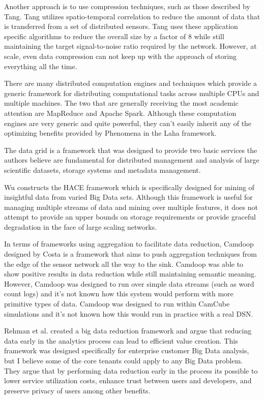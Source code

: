 Another approach is to use compression techniques, such as those described by Tang\cite{tang2004compression}. Tang utilizes spatio-temporal correlation to reduce the amount of data that is transferred from a set of distributed sensors. Tang uses these application specific algorithms to reduce the overall size by a factor of 8 while still maintaining the target signal-to-noise ratio required by the network. However, at scale, even data compression can not keep up with the approach of storing everything all the time.

There are many distributed computation engines and techniques which provide a generic framework for distributing computational tasks across multiple CPUs and multiple machines. The two that are generally receiving the most academic attention are MapReduce\cite{dean2008mapreduce} and Apache Spark\cite{zaharia2016apache}. Although these computation engines are very generic and quite powerful, they can't easily inherit any of the optimizing benefits provided by Phenomena in the Laha framework.

The data grid\cite{chervenak2000data} is a framework that was designed to provide two basic services the authors believe are fundamental for distributed management and analysis of large scientific datasets, storage systems and metadata management.

Wu\cite{wu2014data} constructs the HACE framework which is specifically designed for mining of insightful data from varied Big Data sets. Although this framework is useful for managing multiple streams of data and mining over multiple features, it does not attempt to provide an upper bounds on storage requirements or provide graceful degradation in the face of large scaling networks.

In terms of frameworks using aggregation to facilitate data reduction, Camdoop designed by Costa\cite{costa2012camdoop} is a framework that aims to push aggregation techniques from the edge of the sensor network all the way to the sink. Camdoop was able to show positive results in data reduction while still maintaining semantic meaning. However, Camdoop was designed to run over simple data streams (such as word count logs) and it's not known how this system would perform with more primitive types of data. Camdoop was designed to run within CamCube simulations and it's not known how this would run in practice with a real DSN.

Rehman et al.\cite{ur2016big} created a big data reduction framework and argue that reducing data early in the analytics process can lead to efficient value creation. This framework was designed specifically for enterprise customer Big Data analysis, but I believe some of the core tenants could apply to any Big Data problem. They argue that by performing data reduction early in the process its possible to lower service utilization costs, enhance trust between users and developers, and preserve privacy of users among other benefits.

